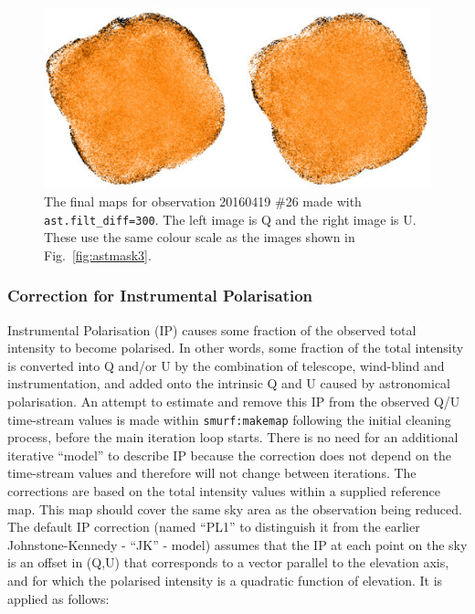 \documentclass[twoside,11pt]{starlink}
\begin{document}
\begin{figure}
\includegraphics[width=\columnwidth]{astmask5}
\caption{The final maps for observation 20160419 \#26 made with
\texttt{ast.filt\_diff=300}. The left image is Q and the right image is U.
These use the same colour scale as the images shown in
Fig.~\ref{fig:astmask3}.}
\label{fig:astmask5}
\end{figure}





\subsubsection{Correction for Instrumental Polarisation}
\label{sec:ip}
Instrumental Polarisation (IP) causes some fraction of the observed total
intensity to become polarised. In other words, some fraction of the total
intensity is converted into Q and/or U by the combination of telescope,
wind-blind and instrumentation, and added onto the intrinsic Q and U
caused by astronomical polarisation. An attempt to estimate and remove
this IP from the observed Q/U time-stream values is made within
\texttt{smurf:makemap} following the initial cleaning process, before the
main iteration loop starts. There is no need for an additional iterative
``model'' to describe IP because the correction does not depend on the
time-stream values and therefore will not change between iterations. The
corrections are based on the total intensity values within a supplied
reference map. This map should cover the same sky area as the observation
being reduced. The default IP correction (named ``PL1'' to distinguish it
from the earlier Johnstone-Kennedy - ``JK'' - model) assumes that the IP
at each point on the sky is an offset in (Q,U) that corresponds to a
vector parallel to the elevation axis, and for which the polarised
intensity is a quadratic function of elevation. It is applied as follows:
\end{document}
